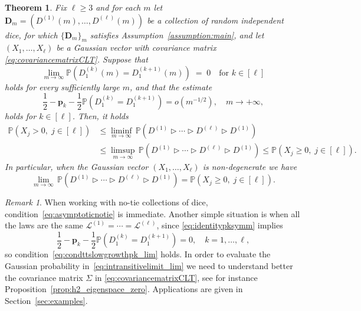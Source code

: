 \documentclass[reqno,a4paper,11pt]{amsart}
\newcommand{\btt}{\triangleright}
\newtheorem{theorem}[lemma]{Theorem}
\theoremstyle{remark}
\newtheorem{remark}[lemma]{Remark}
\newcommand{\mc}[1]{{\mathcal #1}}
\newcommand{\mb}[1]{{\mathbf #1}}
\newcommand{\bb}[1]{{\mathbb #1}}
\numberwithin{equation}{section}
\begin{document}
\begin{theorem}\label{thm:intransitive}
    Fix $\ell\geq 3$ and for each $m$ let $\mb D_m=(D^{(1)}(m),\hdots, D^{(\ell)}(m))$ be a collection of random independent dice, for which $\{\mb D_m\}_m$ satisfies Assumption~\ref{assumption:main}, and let $(X_1,\hdots,X_\ell)$ be a Gaussian vector with covariance matrix \eqref{eq:covariancematrixCLT}. Suppose that 
    \begin{equation}\label{eq:asymptoticnotie}
        \lim_{m\to\infty} \bb P\left(D^{(k)}_1(m)=D_1^{(k+1)}(m)\right)\;=\; 0\quad \text{for } k \in [\ell]
    \end{equation}
    holds for every sufficiently large $m$, and that the estimate
    \begin{equation}\label{eq:condttslowgrowthpk_lim}
        \frac{1}{2}-\mb p_k-\frac{1}{2}\bb P(D_1^{(k)}=D_1^{(k+1)})
         =o(m^{-1/2}),\quad m\to +\infty,
    \end{equation}
    holds for  $k \in [\ell]$. Then, it holds
    \begin{align}
        \bb P\left(X_j> 0,\; j \in [\ell] \right)
        &\le \liminf_{m\to \infty}\,\bb P\left({D^{(1)} \btt \cdots \btt D^{(\ell)} \btt D^{(1)}}\right) \nonumber\\
        &\le \limsup_{m\to \infty}\,\bb P\left({D^{(1)} \btt \cdots \btt D^{(\ell)} \btt D^{(1)}}\right)
        \le \bb P\left(X_j\geq 0,\; j \in [\ell] \right).
        \label{eq:intransitivelimit_ineq}
    \end{align}
    In particular, when the Gaussian vector $(X_1, \hdots, X_\ell)$ is non-degenerate we have
    \begin{equation}\label{eq:intransitivelimit_lim}
        \lim_{m\to \infty}\,\bb P\left({D^{(1)} \btt \cdots \btt D^{(\ell)} \btt D^{(1)}}\right)
        = \bb P\left(X_j\geq 0,\; j \in [\ell] \right).
    \end{equation}
\end{theorem}

\begin{remark}
\label{rem:asymptotic_no_tie}
When working with no-tie collections of dice, condition~\eqref{eq:asymptoticnotie}
is immediate. Another simple situation is when all the laws are the
same $\mc L^{(1)}=\cdots= \mc L^{(\ell)}$, since \eqref{eq:identitypksymm}
implies
\begin{equation*}
\frac{1}{2}-\mb p_k-\frac{1}{2}\bb P\left(D_1^{(k)}=D_1^{(k+1)}\right)=0,\quad k=1,\hdots, \ell,
\end{equation*}
so condition~\eqref{eq:condttslowgrowthpk_lim} holds.
In order to evaluate the Gaussian probability in~\eqref{eq:intransitivelimit_lim} we need to understand
better the covariance matrix $\Sigma$ in \eqref{eq:covariancematrixCLT}, see
for instance Proposition~\ref{prop:h2_eigenspace_zero}.
Applications are given in Section~\ref{sec:examples}.
\end{remark}
\end{document}
